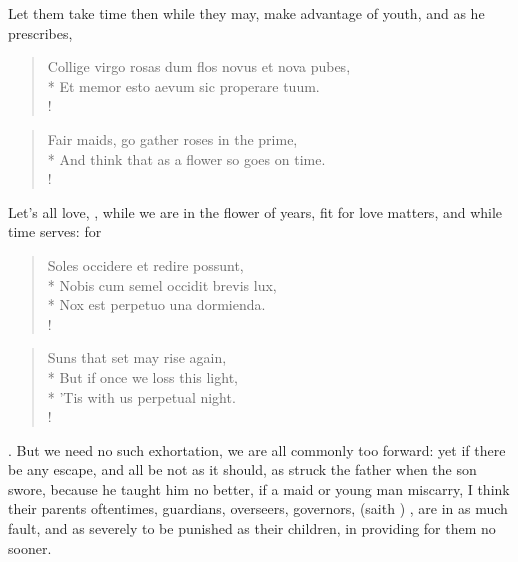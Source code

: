Let them take time then while they may, make advantage of youth, and as
he prescribes,
%
\begin{latin}%
\begin{verse}%
Collige virgo rosas dum flos novus et nova pubes,\\*
Et memor esto aevum sic properare tuum.\\!
\end{verse}%
\end{latin}%
\translationrule%
\begin{verse}%
Fair maids, go gather roses in the prime,\\*
And think that as a flower so goes on time.\\!
\end{verse}%
%

Let's all love, , while we are in the flower of
years, fit for love matters, and while time serves: for
%
\begin{latin}%
\begin{verse}%
Soles occidere et redire possunt,\\*
Nobis cum semel occidit brevis lux,\\*
Nox est perpetuo una dormienda.\\!
\end{verse}%
\end{latin}%
\translationrule%
\begin{verse}
Suns that set may rise again,\\*
But if once we loss this light,\\*
'Tis with us perpetual night.\\!
\end{verse}%
%

. But we need no
such exhortation, we are all commonly too forward: yet if there be any
escape, and all be not as it should, as \Diogenes struck the father when
the son swore, because he taught him no better, if a maid or young man
miscarry, I think their parents oftentimes, guardians, overseers,
governors,  (saith \Chrysostom{}) , \etc{} are in as much fault, and as
severely to be punished as their children, in providing for them no
sooner.

